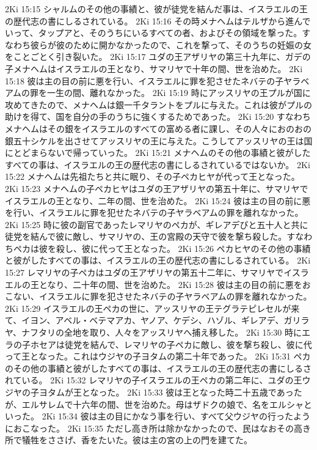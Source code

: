 2Ki 15:15  シャルムのその他の事績と、彼が徒党を結んだ事は、イスラエルの王の歴代志の書にしるされている。
2Ki 15:16  その時メナヘムはテルザから進んでいって、タップアと、そのうちにいるすべての者、およびその領域を撃った。すなわち彼らが彼のために開かなかったので、これを撃って、そのうちの妊娠の女をことごとく引き裂いた。
2Ki 15:17  ユダの王アザリヤの第三十九年に、ガデの子メナヘムはイスラエルの王となり、サマリヤで十年の間、世を治めた。
2Ki 15:18  彼は主の目の前に悪を行い、イスラエルに罪を犯させたネバテの子ヤラベアムの罪を一生の間、離れなかった。
2Ki 15:19  時にアッスリヤの王プルが国に攻めてきたので、メナヘムは銀一千タラントをプルに与えた。これは彼がプルの助けを得て、国を自分の手のうちに強くするためであった。
2Ki 15:20  すなわちメナヘムはその銀をイスラエルのすべての富める者に課し、その人々におのおの銀五十シケルを出させてアッスリヤの王に与えた。こうしてアッスリヤの王は国にとどまらないで帰っていった。
2Ki 15:21  メナヘムのその他の事績と彼がしたすべての事は、イスラエルの王の歴代志の書にしるされているではないか。
2Ki 15:22  メナヘムは先祖たちと共に眠り、その子ペカヒヤが代って王となった。
2Ki 15:23  メナヘムの子ペカヒヤはユダの王アザリヤの第五十年に、サマリヤでイスラエルの王となり、二年の間、世を治めた。
2Ki 15:24  彼は主の目の前に悪を行い、イスラエルに罪を犯せたネバテの子ヤラベアムの罪を離れなかった。
2Ki 15:25  時に彼の副官であったレマリヤのペカが、ギレアデびと五十人と共に徒党を結んで彼に敵し、サマリヤの、王の宮殿の天守で彼を撃ち殺した。すなわちペカは彼を殺し、彼に代って王となった。
2Ki 15:26  ペカヒヤのその他の事績と彼がしたすべての事は、イスラエルの王の歴代志の書にしるされている。
2Ki 15:27  レマリヤの子ペカはユダの王アザリヤの第五十二年に、サマリヤでイスラエルの王となり、二十年の間、世を治めた。
2Ki 15:28  彼は主の目の前に悪をおこない、イスラエルに罪を犯させたネバテの子ヤラベアムの罪を離れなかった。
2Ki 15:29  イスラエルの王ペカの世に、アッスリヤの王テグラテピレセルが来て、イヨン、アベル・ベテマアカ、ヤノア、ケデシ、ハゾル、ギレアデ、ガリラヤ、ナフタリの全地を取り、人々をアッスリヤへ捕え移した。
2Ki 15:30  時にエラの子ホセアは徒党を結んで、レマリヤの子ペカに敵し、彼を撃ち殺し、彼に代って王となった。これはウジヤの子ヨタムの第二十年であった。
2Ki 15:31  ペカのその他の事績と彼がしたすべての事は、イスラエルの王の歴代志の書にしるされている。
2Ki 15:32  レマリヤの子イスラエルの王ペカの第二年に、ユダの王ウジヤの子ヨタムが王となった。
2Ki 15:33  彼は王となった時二十五歳であったが、エルサレムで十六年の間、世を治めた。母はザドクの娘で、名をエルシャといった。
2Ki 15:34  彼は主の目にかなう事を行い、すべて父ウジヤの行ったようにおこなった。
2Ki 15:35  ただし高き所は除かなかったので、民はなおその高き所で犠牲をささげ、香をたいた。彼は主の宮の上の門を建てた。
